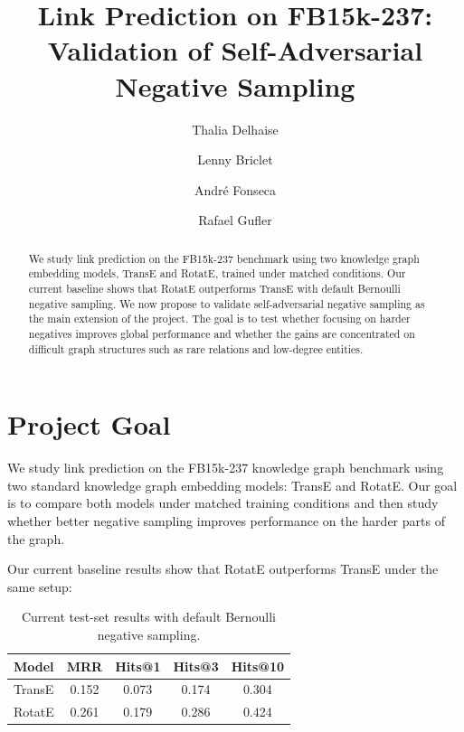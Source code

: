 \documentclass{llncs}
\begin{document}
\title{Link Prediction on FB15k-237:\\
Validation of Self-Adversarial Negative Sampling}

\author{Thalia Delhaise \and Lenny Briclet \and
        Andr\'e Fonseca \and Rafael Gufler}


\maketitle

\begin{abstract}
We study link prediction on the FB15k-237 benchmark using two knowledge
graph embedding models, TransE and RotatE, trained under matched
conditions. Our current baseline shows that RotatE outperforms TransE with
default Bernoulli negative sampling. We now propose to validate
self-adversarial negative sampling as the main extension of the project.
The goal is to test whether focusing on harder negatives improves global
performance and whether the gains are concentrated on difficult graph
structures such as rare relations and low-degree entities.
\end{abstract}

\section{Project Goal}

We study link prediction on the FB15k-237 knowledge graph benchmark using
two standard knowledge graph embedding models: TransE and RotatE.
Our goal is to compare both models under matched training conditions and
then study whether better negative sampling improves performance on the
harder parts of the graph.

Our current baseline results show that RotatE outperforms TransE under
the same setup:

\begin{table}[h]
\centering
\caption{Current test-set results with default Bernoulli negative sampling.}
\label{tab:baseline}
\begin{tabular}{@{}lcccc@{}}
\toprule
Model & MRR & Hits@1 & Hits@3 & Hits@10 \\
\midrule
TransE & 0.152 & 0.073 & 0.174 & 0.304 \\
RotatE & 0.261 & 0.179 & 0.286 & 0.424 \\
\bottomrule
\end{tabular}
\end{table}
\end{document}
